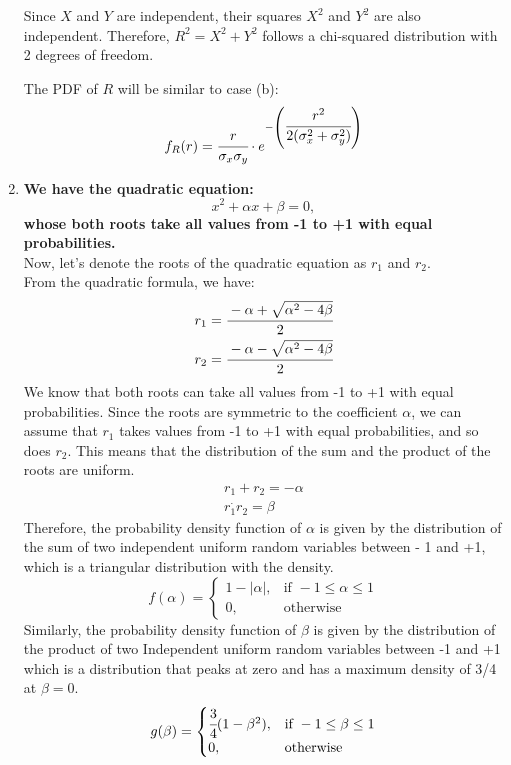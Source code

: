 \documentclass{article}
\begin{document}
\begin{enumerate}
    Since $X$ and $Y$ are independent, their squares $X^2$ and $Y^2$ are also independent. Therefore, $R^2 = X^2 + Y^2$ follows a chi-squared distribution with 2 degrees of freedom.

    The PDF of $R$ will be similar to case (b):
    \[ 
        f_R(r) = \cfrac{r}{\sigma_x \sigma_y}\cdot e^{-\left(\cfrac{r^2}{2(\sigma_x^2 + \sigma_y^2)}\right)}
    \]

\newpage
\item
    \textbf{We have the quadratic equation:
        \[
            x^2 + \alpha x + \beta = 0,
        \]
        whose both roots take all values from -1 to +1 with equal probabilities.}\\
        Now, let's denote the roots of the quadratic equation as $r_1$ and $r_2$.\\
        From the quadratic formula, we have:
        \begin{align}
            r_1 =\cfrac{-\alpha + \sqrt{\alpha^2 - 4\beta}}{2}\\
            r_2 =\cfrac{-\alpha - \sqrt{\alpha^2 - 4\beta}}{2}
        \end{align}
        We know that both roots can take all values from -1 to +1 with equal probabilities. Since the roots are symmetric to the coefficient $\alpha$, we can assume that $r_1$ takes values from -1 to +1 with equal probabilities, and so does $r_2$. This means that the distribution of the sum and the product of the roots are uniform.
        \begin{align}
            r_1 + r_2 = -\alpha\\
            r_1^\cdot r_2 = \beta
        \end{align}
        Therefore, the probability density function of \(\alpha\) is given by the distribution of the sum of two independent uniform random variables between - 1 and +1, which is a triangular distribution with the density.
        \[
            f(\alpha) = \begin{cases}
            1 - |\alpha|, & \text{if } -1\le \alpha \le1\\
            0, & \text{otherwise}
            \end{cases}
        \]
        Similarly, the probability density function of $\beta$ is given by the distribution of the product of two Independent uniform random variables between -1 and +1 which is a distribution that peaks at zero and has a maximum density of 3/4 at $\beta = 0$.
        \[
            g(\beta) = \begin{cases}
            \cfrac{3}{4} (1 - \beta^2), & \text{if } -1\le \beta \le1\\
            0, & \text{otherwise}
            \end{cases}
        \]
        
\end{enumerate}
\end{document}
